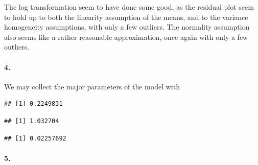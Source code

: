 \documentclass[
]{article}
\newenvironment{Shaded}{\begin{snugshade}}{\end{snugshade}}
\newcommand{\DecValTok}[1]{\textcolor[rgb]{0.00,0.00,0.81}{#1}}
\newcommand{\KeywordTok}[1]{\textcolor[rgb]{0.13,0.29,0.53}{\textbf{#1}}}
\newcommand{\NormalTok}[1]{#1}
\newcommand{\OperatorTok}[1]{\textcolor[rgb]{0.81,0.36,0.00}{\textbf{#1}}}
\newcommand{\StringTok}[1]{\textcolor[rgb]{0.31,0.60,0.02}{#1}}
\begin{document}
The log transformation seem to have done some good, as the residual plot
seem to hold up to both the linearity assumption of the means, and to
the variance homogeneity assumptions, with only a few outliers. The
normality assumption also seems like a rather reasonable approximation,
once again with only a few outliers.

\hypertarget{section-75}{%
\paragraph{\texorpdfstring{\textbf{4.}}{4.}}\label{section-75}}

We may collect the major parameters of the model with

\begin{Shaded}
\end{Shaded}

\begin{verbatim}
## [1] 0.2249831
\end{verbatim}

\begin{Shaded}
\end{Shaded}

\begin{verbatim}
## [1] 1.032704
\end{verbatim}

\begin{Shaded}
\end{Shaded}

\begin{verbatim}
## [1] 0.02257692
\end{verbatim}

\hypertarget{section-76}{%
\paragraph{\texorpdfstring{\textbf{5.}}{5.}}\label{section-76}}
\end{document}
